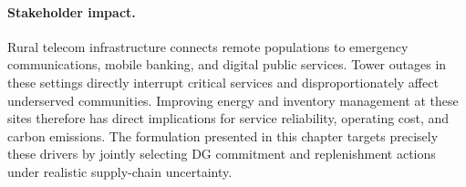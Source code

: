 \paragraph{Stakeholder impact.}
Rural telecom infrastructure connects remote populations to emergency
communications, mobile banking, and digital public services.  
Tower outages in these settings directly interrupt critical services and
disproportionately affect underserved communities.  Improving energy and
inventory management at these sites therefore has direct implications for
service reliability, operating cost, and carbon emissions.  The formulation
presented in this chapter targets precisely these drivers by jointly selecting DG commitment and replenishment actions under realistic supply-chain
uncertainty.
